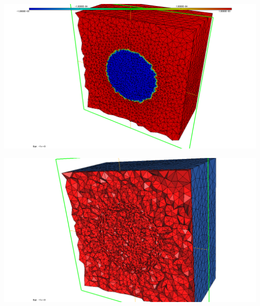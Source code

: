 \begingroup
	\begin{minipage}[t]{.5\linewidth}
		\centering
		\includegraphics[clip=true, trim=5cm 0 2cm 0, scale=.2]{Bordeaux/figures/3D/sphereDomLS.png}
	\end{minipage}
	\hfill
	\begin{minipage}[t]{.5\linewidth}
		\centering
		\includegraphics[clip=true, trim=5cm 0 5cm 0, scale=.2]{Bordeaux/figures/3D/sphereAdapt.png}
	\end{minipage}
\endgroup


